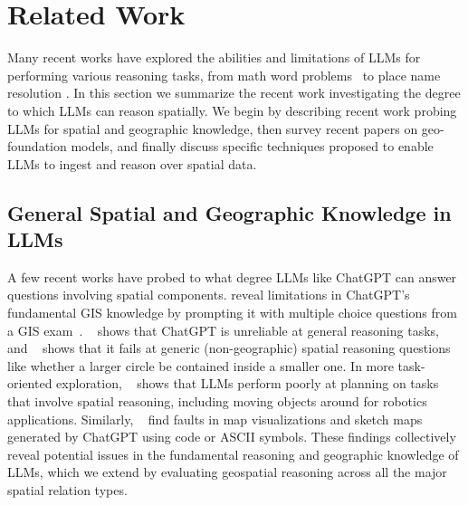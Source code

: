 \section{Related Work}
\label{section:related}
\normalsize

Many recent works have explored the abilities and limitations of LLMs for performing various reasoning tasks, from math word problems~\cite{Gao2023, Badaro2023} to place name resolution \cite{Mai2024}.
In this section we summarize the recent work investigating the degree to which LLMs can reason spatially.
We begin by describing recent work probing LLMs for spatial and geographic knowledge, then survey recent papers on geo-foundation models, and finally discuss specific techniques proposed to enable LLMs to ingest and reason over spatial data.


\subsection{General Spatial and Geographic Knowledge in LLMs}
A few recent works have probed to what degree LLMs like ChatGPT can answer questions involving spatial components.
%
\citeauthor{Mooney2023} reveal limitations in ChatGPT's fundamental GIS knowledge by prompting it with multiple choice questions from a GIS exam~\cite{Mooney2023}.
\citeauthor{Bang2023}~\cite{Bang2023} shows that ChatGPT is unreliable at general reasoning tasks, and
\citeauthor{Cohn2023}~\cite{Cohn2023} shows that it fails at generic (non-geographic) spatial reasoning questions like whether a larger circle be contained inside a smaller one.
In more task-oriented exploration, 
\citeauthor{Xie2023translating}~\cite{Xie2023translating} shows that LLMs perform poorly at planning on tasks that involve spatial reasoning, including moving objects around for robotics applications.
Similarly, 
\citeauthor{Tao2023}~\cite{Tao2023} find faults in map visualizations and sketch maps generated by ChatGPT using code or ASCII symbols.
%
These findings collectively reveal potential issues in the fundamental reasoning and geographic knowledge of LLMs, which we extend by evaluating geospatial reasoning across all the major spatial relation types.





